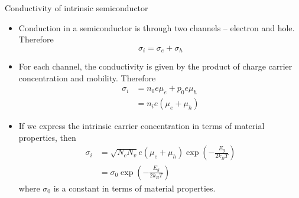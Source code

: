 \begin{frame}[label=pre-M2T1-slot1]{Conductivity of intrinsic semiconductor}
\begin{small}
		\begin{itemize}
		\item Conduction in a semiconductor is through two channels -- electron and hole. Therefore
		\[
		\sigma_i = \sigma_e + \sigma_h
		\]
		\item For each channel, the conductivity is given by the product of charge carrier concentration and mobility. Therefore
		\begin{align*}
			\sigma_i &= n_0 e \mu_e + p_0 e \mu_h	\\
			&= n_i e \left(\mu_e + \mu_h\right)
		\end{align*}
		\begin{center}
		\end{center}
		\item If we express the intrinsic carrier concentration in terms of material properties, then
		\begin{align*}
			\sigma_i &= \sqrt{N_c N_v}e \left(\mu_e + \mu_h\right)\exp\left(-\frac{E_g}{2k_BT}\right)	\\
			&= \sigma_0 \exp\left(-\frac{E_g}{2k_BT}\right)
		\end{align*}
		where \(\sigma_0\) is a constant in terms of material properties.
	\end{itemize}
\end{small}
\end{frame}
%
